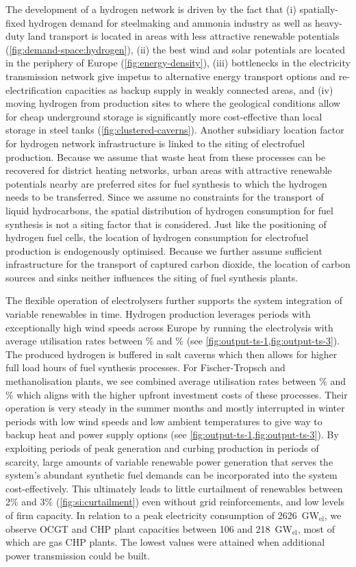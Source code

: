 The development of a hydrogen network is driven by the fact that (i)
spatially-fixed hydrogen demand for steelmaking and ammonia industry as well as
heavy-duty land transport is located in areas with less attractive renewable
potentials (\cref{fig:demand-space:hydrogen}), (ii) the best wind and solar
potentials are located in the periphery of Europe (\cref{fig:energy-density}),
(iii) bottlenecks in the electricity transmission network give impetus to
alternative energy transport options and re-electrification capacities as backup
supply in weakly connected areas, and (iv) moving hydrogen from production sites
to where the geological conditions allow for cheap underground storage is
significantly more cost-effective than local storage in steel tanks
(\cref{fig:clustered-caverns}). Another subsidiary location factor for hydrogen
network infrastructure is linked to the siting of electrofuel production.
Because we assume that waste heat from these processes can be recovered for
district heating networks, urban areas with attractive renewable potentials
nearby are preferred sites for fuel synthesis to which the hydrogen needs to be
transferred. Since we assume no constraints for the transport of liquid
hydrocarbons, the spatial distribution of hydrogen consumption for fuel
synthesis is not a siting factor that is considered. Just like the positioning
of hydrogen fuel cells, the location of hydrogen consumption for electrofuel
production is endogenously optimised. Because we further assume sufficient
infrastructure for the transport of captured carbon dioxide, the location of
carbon sources and sinks neither influences the siting of fuel synthesis plants.

The flexible operation of electrolysers further supports the system integration
of variable renewables in time. Hydrogen production leverages periods with
exceptionally high wind speeds across Europe by running the electrolysis with
average utilisation rates between \mincfelectrolysis\% and \maxcfelectrolysis\%
(see \cref{fig:output-ts-1,fig:output-ts-3}). The produced hydrogen is buffered
in salt caverns which then allows for higher full load hours of fuel synthesis
processes. For Fischer-Tropsch and methanolisation plants, we see combined
average utilisation rates between \mincfFT\% and \maxcfFT\% which aligns with
the higher upfront investment costs of these processes. Their operation is very
steady in the summer months and mostly interrupted in winter periods with low
wind speeds and low ambient temperatures to give way to backup heat and power
supply options (see \cref{fig:output-ts-1,fig:output-ts-3}). By exploiting
periods of peak generation and curbing production in periods of scarcity, large
amounts of variable renewable power generation that serves the system's abundant
synthetic fuel demands can be incorporated into the system cost-effectively.
This ultimately leads to little curtailment of renewables between 2\% and 3\%
(\cref{fig:si:curtailment}) even without grid reinforcements, and low levels of
firm capacity. In relation to a peak electricity consumption of
2626~GW$_{\textrm{el}}$, we observe OCGT and CHP plant capacities between 106
and 218~GW$_{\textrm{el}}$, most of which are gas CHP plants. The lowest values
were attained when additional power transmission could be built.

